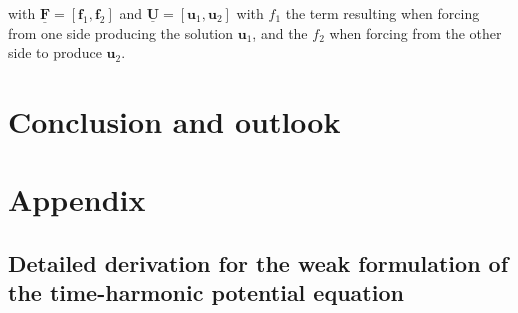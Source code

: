 \documentclass[11pt, a4paper]{article}
\begin{document}
with $\mathbf{\underline{F}} = [\mathbf{f}_1, \mathbf{f}_2]$ and
$\mathbf{\underline{U}} = [\mathbf{u}_1, \mathbf{u}_2]$ with $f_1$ the term
resulting when forcing from one side producing the solution $\mathbf{u}_1$,
and the $f_2$ when forcing from the other side to produce $\mathbf{u}_2$.

\newpage
\section{Conclusion and outlook}
\label{sec:conclusion}

\newpage


\newpage
\section{Appendix}
\label{sec:appendix}

\subsection{Detailed derivation for the weak formulation of the time-harmonic potential equation}
\label{subsec:derivation}
\end{document}
